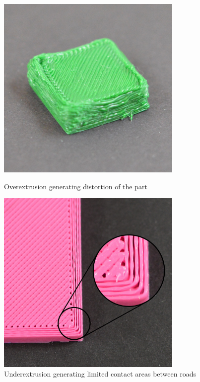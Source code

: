 \begin{figure}
\centering
\begin{minipage}{.5\textwidth}
  \centering
    \includegraphics[width=0.8\textwidth]{chapter_2/figures/overextrusion.jpg}
    \caption{Overextrusion generating distortion of the part \cite{Simplefy3DPrintGuide}}
    \label{fig:overextrusion}
\end{minipage}%
\begin{minipage}{.5\textwidth}
  \centering
    \includegraphics[width=0.8\textwidth]{chapter_2/figures/underextrusion.jpg}
    \caption{Underextrusion generating limited contact areas between roads \cite{Simplefy3DPrintGuide}}
    \label{fig:underextrusion}
\end{minipage}
\end{figure}

